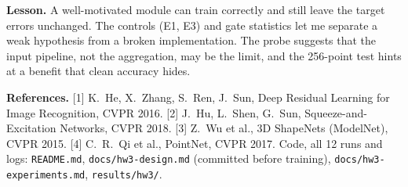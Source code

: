 \documentclass[10pt]{article}
\begin{document}
\textbf{Lesson.} A well-motivated module can train correctly and still leave the target errors unchanged. The controls (E1, E3) and gate statistics let me separate a weak hypothesis from a broken implementation. The probe suggests that the input pipeline, not the aggregation, may be the limit, and the 256-point test hints at a benefit that clean accuracy hides.

{\footnotesize
\textbf{References.}
[1] K.~He, X.~Zhang, S.~Ren, J.~Sun, Deep Residual Learning for Image Recognition, CVPR 2016.
[2] J.~Hu, L.~Shen, G.~Sun, Squeeze-and-Excitation Networks, CVPR 2018.
[3] Z.~Wu et al., 3D ShapeNets (ModelNet), CVPR 2015.
[4] C.~R.~Qi et al., PointNet, CVPR 2017.
Code, all 12 runs and logs: \texttt{README.md}, \texttt{docs/hw3-design.md} (committed before training), \texttt{docs/hw3-experiments.md}, \texttt{results/hw3/}.\par}
\end{document}

